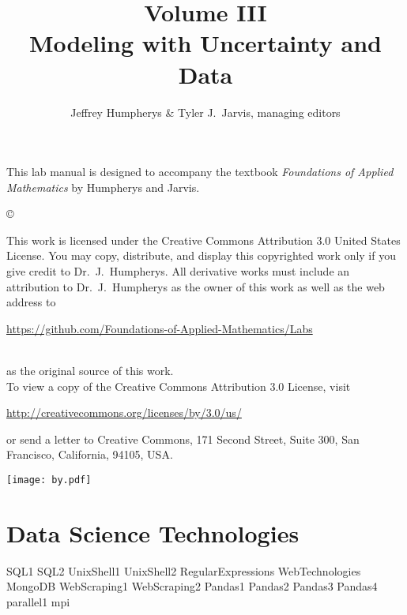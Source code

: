 \documentclass[opener-c,labs,yellow,nociteref]{HJnewsiambook}
\title{Volume III\\ Modeling with Uncertainty and Data}
\author{Jeffrey Humpherys \& Tyler J.~Jarvis, managing editors}
\begin{document}

\thispagestyle{empty} %
\maketitle
\thispagestyle{empty}
\frontmatter



\begin{thepreface} %

This lab manual is designed to accompany the textbook \emph{Foundations of Applied Mathematics} by Humpherys and Jarvis.

\vfill
\copyright{This work is licensed under the Creative Commons Attribution 3.0 United States License.
You may copy, distribute, and display this copyrighted work only if you give credit to Dr.~J.~Humpherys.
All derivative works must include an attribution to Dr.~J.~Humpherys as the owner of this work as well as the web address to
\\\centerline{\url{https://github.com/Foundations-of-Applied-Mathematics/Labs}}\\as the original source of this work.
\\To view a copy of the Creative Commons Attribution 3.0 License, visit
\\\centerline{\url{http://creativecommons.org/licenses/by/3.0/us/}} or send a letter to Creative Commons, 171 Second Street, Suite 300, San Francisco, California, 94105, USA.}

\vfill
\centering\texttt{[image: by.pdf]}
\vfill
\end{thepreface}

\setcounter{tocdepth}{1}
\tableofcontents

\mainmatter %

\part{Data Science Technologies} %
{SQL1}
{SQL2}
{UnixShell1}
{UnixShell2}
{RegularExpressions}
{WebTechnologies}
{MongoDB}
{WebScraping1}
{WebScraping2}
{Pandas1}
{Pandas2}
{Pandas3}
{Pandas4}
{parallel1}
{mpi}
\end{document}

